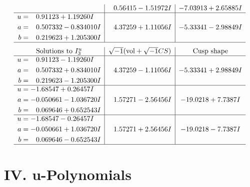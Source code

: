 \documentclass[1p]{elsarticle_modified}
\theoremstyle{definition}
\newcommand{\I}{\sqrt{-1}}
\begin{document}
$$\begin{array}{c|c|c}
 & \phantom{-}0.56415 - 1.51972 I & -7.03913 + 2.65885 I \\ \hline\begin{aligned}
u &= \phantom{-}0.91123 + 1.19260 I \\
a &= \phantom{-}0.507332 - 0.834010 I \\
b &= \phantom{-}0.219623 + 1.205300 I\end{aligned}
 & \phantom{-}4.37259 + 1.11056 I & -5.33341 - 2.98849 I\\
 \hline 
 \end{array}$$\newpage$$\begin{array}{c|c|c}  
\text{Solutions to }I^u_{3}& \I (\text{vol} + \sqrt{-1}CS) & \text{Cusp shape}\\
 \hline 
\begin{aligned}
u &= \phantom{-}0.91123 - 1.19260 I \\
a &= \phantom{-}0.507332 + 0.834010 I \\
b &= \phantom{-}0.219623 - 1.205300 I\end{aligned}
 & \phantom{-}4.37259 - 1.11056 I & -5.33341 + 2.98849 I \\ \hline\begin{aligned}
u &= -1.68547 + 0.26457 I \\
a &= -0.050661 - 1.036720 I \\
b &= \phantom{-}0.069646 + 0.652543 I\end{aligned}
 & \phantom{-}1.57271 - 2.56456 I & -19.0218 + 7.7387 I \\ \hline\begin{aligned}
u &= -1.68547 - 0.26457 I \\
a &= -0.050661 + 1.036720 I \\
b &= \phantom{-}0.069646 - 0.652543 I\end{aligned}
 & \phantom{-}1.57271 + 2.56456 I & -19.0218 - 7.7387 I\\
 \hline 
 \end{array}$$\newpage
\newpage\renewcommand{\arraystretch}{1}
\centering \section*{ IV. u-Polynomials}
\end{document}
